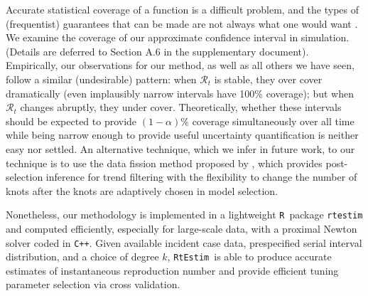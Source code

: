 \documentclass[10pt,letterpaper]{article}
\newcommand{\R}{\texttt{R}}
\newcommand{\cpp}{\texttt{C++}}
\def\RtEstim{\texttt{RtEstim}}
\begin{document}
Accurate statistical coverage of a function is a difficult problem, and the
types of (frequentist) guarantees that can be made are not always what one would
want \cite{genovese2008adaptive}. We examine the coverage of our approximate
confidence interval in simulation. (Details are deferred to Section A.6 in the
supplementary document). Empirically, our observations for our method, as well
as all others we have seen, follow a similar (undesirable) pattern: when
$\mathcal{R}_t$ is stable, they over cover dramatically (even implausibly narrow
intervals have 100\% coverage); but when $\mathcal{R}_t$ changes abruptly, they
under cover. Theoretically, whether these intervals should be expected to
provide $(1-\alpha)\%$ coverage simultaneously over all time while being narrow
enough to provide useful uncertainty quantification is neither easy nor settled. 
An alternative technique, which we infer in future work, to our technique is
to use the data fission method proposed by \cite{leiner2023data}, which provides 
post-selection inference for trend filtering with the flexibility to change the 
number of knots after the knots are adaptively chosen in model selection. 


Nonetheless, our methodology is implemented in a lightweight \R\ package
\texttt{rtestim} and computed efficiently, especially for large-scale data, with
a proximal Newton solver coded in \cpp. Given available incident case data,
prespecified serial interval distribution, and a choice of degree $k$, \RtEstim\
is able to produce accurate estimates of instantaneous reproduction number and
provide efficient tuning parameter selection via cross validation. 


%
%
\end{document}
